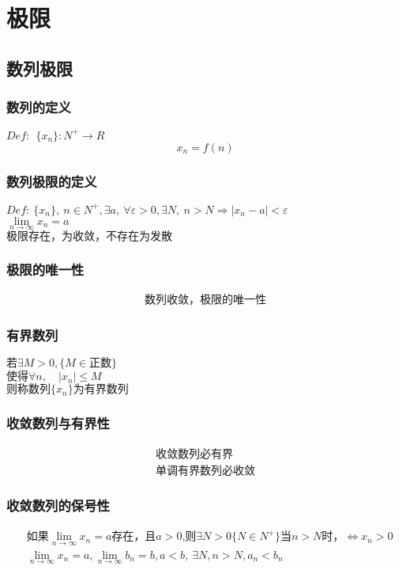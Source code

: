 \section{极限}
\subsection{数列极限}
\subsubsection{数列的定义}
$Def:\ \ \{x_n\}: N^+\rightarrow R $
$$x_n = f(n)$$
\subsubsection{数列极限的定义}
$Def:\ \{x_n\},\ n\in N^+,\exists  a,\ \forall\varepsilon>0,\exists N,\ n>N\Rightarrow \left|x_n-a\right|<\varepsilon$\\
$\lim\limits_{n \to \infty}{x_n}=a$\\ 
$\mbox{极限存在，为收敛，不存在为发散}$
\subsubsection{极限的唯一性}
\begin{align}
\mbox{数列收敛，极限的唯一性}\label{limit_sequence}
\end{align}
\subsubsection{有界数列}
$\mbox{若}\exists M>0,\{M\in\mbox{正数}\}$\\
$\mbox{使得}\forall n,\quad\left|x_n\right|\leqslant M$\\
$\mbox{则称数列$\{x_n\}$为有界数列}$
\subsubsection{收敛数列与有界性}
\begin{align}
    \mbox{收敛数列必有界}\label{sequence_bounded_1}\\
    \mbox{单调有界数列必收敛}\label{sequence_bounded_2}
\end{align}
\subsubsection{收敛数列的保号性}
\begin{align}
   &\mbox{如果$\lim\limits_{n \to\infty}x_n=a$存在，且$a>0$,则$\exists N>0\{N\in N^+\}$当$n>N$时，$\Leftrightarrow x_n>0$}\label{Serial_number_preservation_a}\\
    &\lim\limits_{n\to\infty}x_n=a,\lim\limits_{n\to\infty}b_n=b,a<b,\ \exists N,n>N,a_n<b_n \label{Serial_number_preservation_b}
\end{align}
